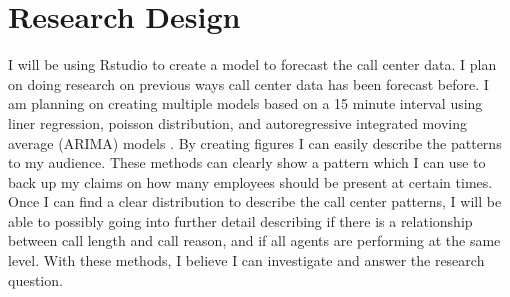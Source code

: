 \documentclass[12pt]{article}
\begin{document}
\section*{Research Design}
I will be using Rstudio to create a model to forecast the call center data. I plan on doing research on previous ways call center data
has been forecast before. I am planning on creating multiple models based on a 15 minute interval using liner regression, poisson distribution,
and autoregressive integrated moving average (ARIMA) models \citep*{ibrahim2016modeling}. By creating figures I can
easily describe the patterns to my audience. These methods can clearly show a pattern which I can use to back up my claims on how many 
employees should be present at certain times. Once I can find a clear distribution to describe the call center patterns, I will be
able to possibly going into further detail describing if there is a relationship between call length and call reason, and if all agents are
performing at the same level. With these methods, I believe I can investigate and answer the research question. 



\end{document}
